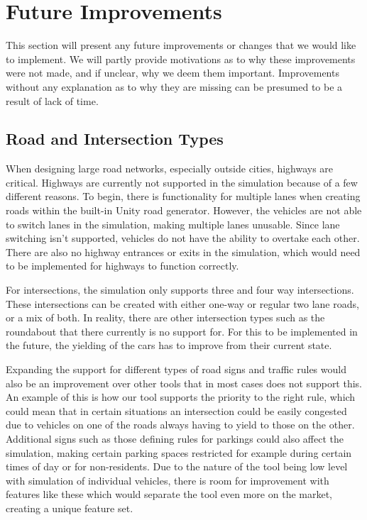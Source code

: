 \section{Future Improvements}
    This section will present any future improvements or changes that we would like to implement. We will partly provide motivations as to why these improvements were not made, and if unclear, why we deem them important. Improvements without any explanation as to why they are missing can be presumed to be a result of lack of time.
    
    \subsection{Road and Intersection Types}
        When designing large road networks, especially outside cities, highways are critical. Highways are currently not supported in the simulation because of a few different reasons. To begin, there is functionality for multiple lanes when creating roads within the built-in Unity road generator. However, the vehicles are not able to switch lanes in the simulation, making multiple lanes unusable. Since lane switching isn't supported, vehicles do not have the ability to overtake each other. There are also no highway entrances or exits in the simulation, which would need to be implemented for highways to function correctly.

        For intersections, the simulation only supports three and four way intersections. These intersections can be created with either one-way or regular two lane roads, or a mix of both. In reality, there are other intersection types such as the roundabout that there currently is no support for. For this to be implemented in the future, the yielding of the cars has to improve from their current state.

        Expanding the support for different types of road signs and traffic rules would also be an improvement over other tools that in most cases does not support this. An example of this is how our tool supports the priority to the right rule, which could mean that in certain situations an intersection could be easily congested due to vehicles on one of the roads always having to yield to those on the other. Additional signs such as those defining rules for parkings could also affect the simulation, making certain parking spaces restricted for example during certain times of day or for non-residents. Due to the nature of the tool being low level with simulation of individual vehicles, there is room for improvement with features like these which would separate the tool even more on the market, creating a unique feature set.

